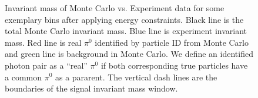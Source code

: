 \begin{figure}[H]
  \centering     
  \caption{Invariant mass of Monte Carlo vs. Experiment data for some exemplary bins after applying energy constraints. Black line is the total Monte Carlo invariant mass. Blue line is experiment invariant mass. Red line is real $\pi^0$ identified by particle ID from Monte Carlo and green line is background in Monte Carlo. We define an identified photon pair as a ``real'' $\pi^0$ if both corresponding true particles have a common $\pi^0$ as a pararent. The vertical dash lines are the boundaries of the signal invariant mass window.}
  \label{fig:pi0MC_Exp}
\end{figure}


